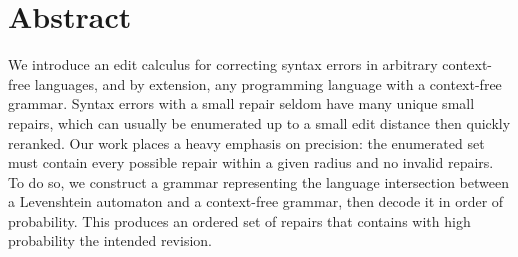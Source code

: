 \chapter*{\rm\bfseries Abstract}
\label{ch:abstraten}

%

We introduce an edit calculus for correcting syntax errors in arbitrary context-free languages, and by extension, any programming language with a context-free grammar. Syntax errors with a small repair seldom have many unique small repairs, which can usually be enumerated up to a small edit distance then quickly reranked. Our work places a heavy emphasis on precision: the enumerated set must contain every possible repair within a given radius and no invalid repairs. To do so, we construct a grammar representing the language intersection between a Levenshtein automaton and a context-free grammar, then decode it in order of probability. This produces an ordered set of repairs that contains with high probability the intended revision.